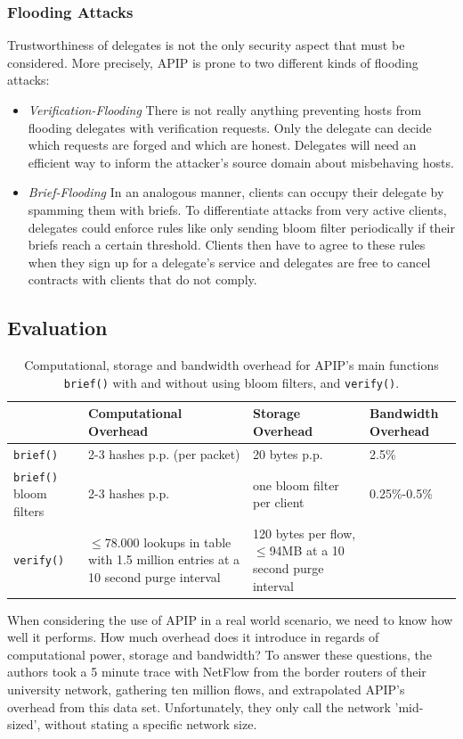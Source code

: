 \documentclass{acm_proc_article-sp}
\begin{document}
\subsubsection{Flooding Attacks}
Trustworthiness of delegates is not the only security aspect that must be considered. More precisely, APIP is prone to two different kinds of flooding attacks:
\begin{itemize}
\item \emph{Verification-Flooding} There is not really anything preventing hosts from flooding delegates with verification requests. Only the delegate can decide which requests are forged and which are honest. Delegates will need an efficient way to inform the attacker's source domain about misbehaving hosts. 
\item \emph{Brief-Flooding} In an analogous manner, clients can occupy their delegate by spamming them with briefs. To differentiate attacks from very active clients, delegates could enforce rules like only sending bloom filter periodically if their briefs reach a certain threshold. Clients then have to agree to these rules when they sign up for a delegate's service and delegates are free to cancel contracts with clients that do not comply.
\end{itemize}

\subsection{Evaluation}
\begin{table}[t]
	\renewcommand{\arraystretch}{1.5}
	\begin{tabularx}{\textwidth}{lXXX}
		\hline 
 		& \textbf{Computational Overhead} & \textbf{Storage Overhead} & \textbf{Bandwidth Overhead} \\ \hline
		\texttt{brief()} & 2-3 hashes p.p. (per packet) & 20 bytes p.p. & 2.5\% \\ 
		\texttt{brief()} bloom filters & 2-3 hashes p.p. & one bloom filter per client & 0.25\%-0.5\% \\ 
		\texttt{verify()} & $\le$78.000 lookups in table with 1.5 million entries at a 10 second purge interval & 120 bytes per flow, $\le$94MB at a 10 second purge interval & \\ 
		\hline
	\end{tabularx}
	\caption{Computational, storage and bandwidth overhead for APIP's main functions \texttt{brief()} with and without using bloom filters, and \texttt{verify()}.}
	\label{tab:evalcomparison}
\end{table}
When considering the use of APIP in a real world scenario, we need to know how well it performs. How much overhead does it introduce in regards of computational power, storage and bandwidth? To answer these questions, the authors took a 5 minute trace with NetFlow from the border routers of their university network, gathering ten million flows, and extrapolated APIP's overhead from this data set. Unfortunately, they only call the network 'mid-sized', without stating a specific network size. 
\end{document}
